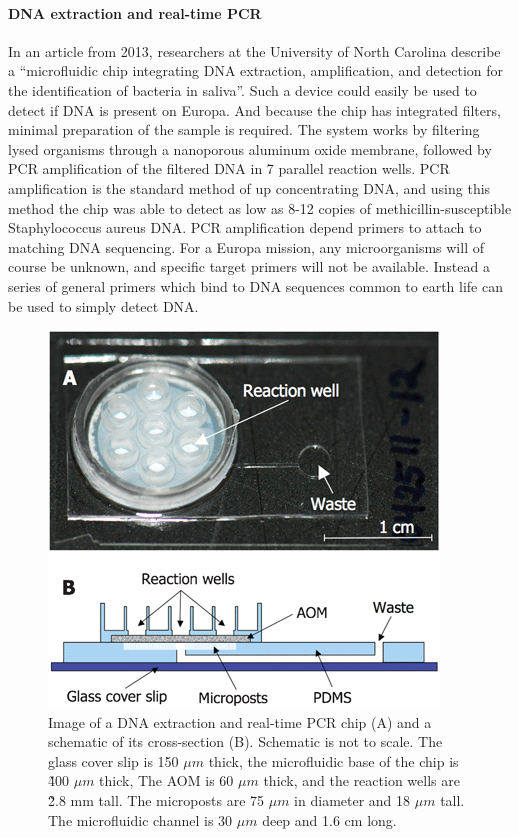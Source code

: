 \paragraph{DNA extraction and real-time PCR \cite{Oblath2013}}
In an article from 2013, researchers at the University of North Carolina describe a “microfluidic chip integrating DNA extraction, amplification, and detection for the identification of bacteria in saliva”. Such a device could easily be used to detect if DNA is present on Europa. And because the chip has integrated filters, minimal preparation of the sample is required. The system works by filtering lysed organisms through a nanoporous aluminum oxide membrane, followed by PCR amplification of the filtered DNA in 7 parallel reaction wells. PCR amplification is the standard method of up concentrating DNA, and using this method the chip was able to detect as low as 8-12 copies of methicillin-susceptible Staphylococcus aureus DNA. PCR amplification depend primers to attach to matching DNA sequencing. For a Europa mission, any microorganisms will of course be unknown, and specific target primers will not be available. Instead a series of general primers which bind to DNA sequences common to earth life can be used to simply detect DNA. 
\begin{figure}[htb]
	\centering
	\includegraphics[width=\textwidth]{figures/mlh/reactionwells.png}
	\caption{Image of a DNA extraction and real-time PCR chip (A) and a schematic of its cross-section (B). Schematic is not to scale. The glass cover slip is 150 $\mu m$ thick, the microfluidic base of the chip is \~400 $\mu m$ thick, The AOM is 60 $\mu m$ thick, and the reaction wells are \~2.8 mm tall. The microposts are 75 $\mu m$ in diameter and 18 $\mu m$ tall. The microfluidic channel is 30 $\mu m$ deep and 1.6 cm long. \cite{Oblath2013}}
	\label{fig:DNAPCRchip}
\end{figure}

